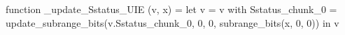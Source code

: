 function _update_Sstatus_UIE (v, x) = let v = { v with Sstatus_chunk_0 = update_subrange_bits(v.Sstatus_chunk_0, 0, 0, subrange_bits(x, 0, 0)) } in
  v
